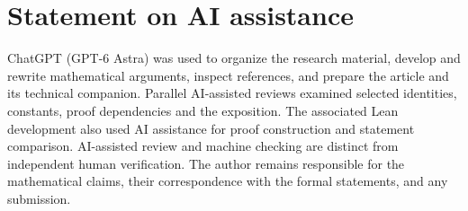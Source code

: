 \section*{Statement on AI assistance}
ChatGPT (GPT-6 Astra) was used to organize the research material,
develop and rewrite mathematical arguments, inspect references,
and prepare the article and its technical companion.
Parallel AI-assisted reviews examined selected identities, constants,
proof dependencies and the exposition. The associated
Lean development also used AI assistance for proof construction and
statement comparison. AI-assisted review and machine checking are
distinct from independent human verification. The author remains
responsible for the mathematical claims, their correspondence with
the formal statements, and any submission.
